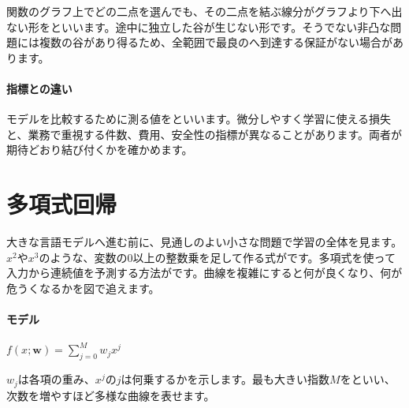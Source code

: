         関数のグラフ上でどの二点を選んでも、その二点を結ぶ線分がグラフより下へ出ない形をといいます。途中に独立した谷が生じない形です。そうでない非凸な問題には複数の谷があり得るため、全範囲で最良のへ到達する保証がない場合があります。

\paragraph{指標との違い}
        モデルを比較するために測る値をといいます。微分しやすく学習に使える損失と、業務で重視する件数、費用、安全性の指標が異なることがあります。両者が期待どおり結び付くかを確かめます。

\par
\endgroup
\par
\endgroup


\section{多項式回帰}
\label{sec:06-machine-learning-08}

大きな言語モデルへ進む前に、見通しのよい小さな問題で学習の全体を見ます。$x^2$や$x^3$のような、変数の0以上の整数乗を足して作る式がです。多項式を使って入力から連続値を予測する方法がです。曲線を複雑にすると何が良くなり、何が危うくなるかを図で追えます。

\begingroup
\begingroup
      \centering
\par
\endgroup
\medskip
\begingroup
\paragraph{モデル}
        {\centering$\displaystyle f(x;\mathbf{w})=\sum_{j=0}^{M}w_jx^j$\par}
        $w_j$は各項の重み、$x^j$の$j$は何乗するかを示します。最も大きい指数$M$をといい、次数を増やすほど多様な曲線を表せます。

